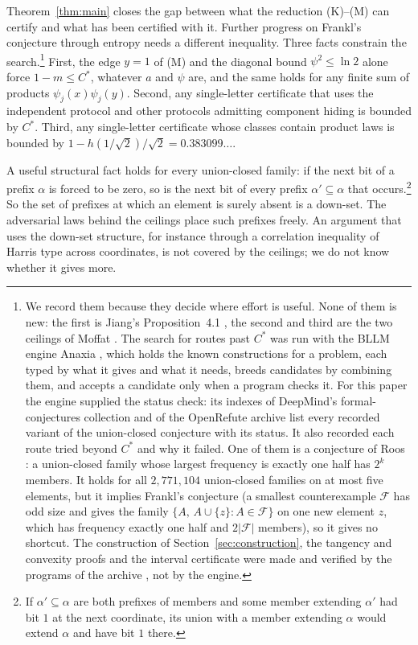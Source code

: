 \documentclass[12pt]{article}
\theoremstyle{plain}
\newcommand{\cF}{\mathcal{F}}
\newcommand{\Cs}{C^{*}}
\begin{document}
Theorem~\ref{thm:main} closes the gap between what the reduction (K)--(M) can certify and what has been certified with it. Further progress on Frankl's conjecture through entropy needs a different inequality. Three facts constrain the search.\footnote{We record them because they decide where effort is useful. None of them is new: the first is Jiang's Proposition~4.1 \cite{Jia26}, the second and third are the two ceilings of Moffat \cite{Mof26}. The search for routes past $\Cs$ was run with the BLLM engine Anaxia \cite{Ana26}, which holds the known constructions for a problem, each typed by what it gives and what it needs, breeds candidates by combining them, and accepts a candidate only when a program checks it. For this paper the engine supplied the status check: its indexes of DeepMind's formal-conjectures collection and of the OpenRefute archive list every recorded variant of the union-closed conjecture with its status. It also recorded each route tried beyond $\Cs$ and why it failed. One of them is a conjecture of Roos \cite{Roo23}: a union-closed family whose largest frequency is exactly one half has $2^k$ members. It holds for all $2{,}771{,}104$ union-closed families on at most five elements, but it implies Frankl's conjecture (a smallest counterexample $\cF$ has odd size and gives the family $\{A,\,A\cup\{z\}:A\in\cF\}$ on one new element $z$, which has frequency exactly one half and $2|\cF|$ members), so it gives no shortcut. The construction of Section~\ref{sec:construction}, the tangency and convexity proofs and the interval certificate were made and verified by the programs of the archive \cite{BB26z}, not by the engine.} First, the edge $y=1$ of (M) and the diagonal bound $\psi^2\le\ln2$ alone force $1-m\le\Cs$, whatever $a$ and $\psi$ are, and the same holds for any finite sum of products $\psi_j(x)\psi_j(y)$. Second, any single-letter certificate that uses the independent protocol and other protocols admitting component hiding is bounded by $\Cs$. Third, any single-letter certificate whose classes contain product laws is bounded by $1-h(1/\sqrt2)/\sqrt2=0.383099\ldots$.

A useful structural fact holds for every union-closed family: if the next bit of a prefix $\alpha$ is forced to be zero, so is the next bit of every prefix $\alpha'\subseteq\alpha$ that occurs.\footnote{If $\alpha'\subseteq\alpha$ are both prefixes of members and some member extending $\alpha'$ had bit $1$ at the next coordinate, its union with a member extending $\alpha$ would extend $\alpha$ and have bit $1$ there.} So the set of prefixes at which an element is surely absent is a down-set. The adversarial laws behind the ceilings place such prefixes freely. An argument that uses the down-set structure, for instance through a correlation inequality of Harris type across coordinates, is not covered by the ceilings; we do not know whether it gives more.
\end{document}

